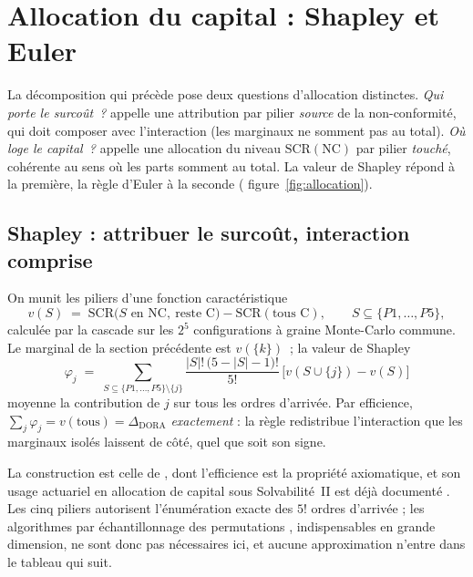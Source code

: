 \section{Allocation du capital : Shapley et Euler}
\label{sec:allocation}

La décomposition qui précède pose deux questions d'allocation distinctes. \emph{Qui porte le
surcoût~?} appelle une attribution par pilier \emph{source} de la non-conformité, qui doit
composer avec l'interaction (les marginaux ne somment pas au total). \emph{Où loge le
capital~?} appelle une allocation du niveau $\mathrm{SCR}(\text{NC})$ par pilier
\emph{touché}, cohérente au sens où les parts somment au total. La valeur de Shapley répond
à la première, la règle d'Euler à la seconde (%
figure~\ref{fig:allocation}).

\subsection{Shapley : attribuer le surcoût, interaction comprise}

On munit les piliers d'une fonction caractéristique
\[
v(S) \;=\; \mathrm{SCR}\bigl(S \text{ en NC},\ \text{reste C}\bigr)-\mathrm{SCR}(\text{tous C}),
\qquad S \subseteq \{P1,\dots,P5\},
\]
calculée par la cascade sur les $2^5$ configurations à graine Monte-Carlo commune. Le
marginal de la section précédente est $v(\{k\})$~; la valeur de Shapley
\[
\varphi_j \;=\; \sum_{S \subseteq \{P1,\dots,P5\}\setminus\{j\}}
\frac{|S|!\,\bigl(5-|S|-1\bigr)!}{5!}\,\bigl[v(S\cup\{j\})-v(S)\bigr]
\]
moyenne la contribution de $j$ sur tous les ordres d'arrivée. Par efficience,
$\sum_j \varphi_j = v(\text{tous}) = \Delta_{\text{DORA}}$ \emph{exactement} : la règle
redistribue l'interaction que les marginaux isolés laissent de côté, quel que soit son signe.

La construction est celle de \citet{Shapley1953}, dont l'efficience est la propriété
axiomatique, et son usage actuariel en allocation de capital sous Solvabilité~II est déjà
documenté \citep{Decupere2011}. Les cinq piliers autorisent l'énumération exacte des $5!$
ordres d'arrivée ; les algorithmes par échantillonnage des permutations
\citep{CastroGomezTejada2009, SongNelsonStaum2016}, indispensables en grande dimension, ne
sont donc pas nécessaires ici, et aucune approximation n'entre dans le tableau qui suit.

